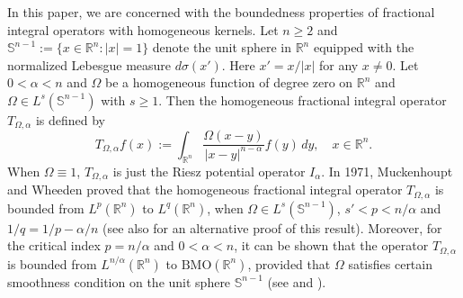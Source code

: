 \documentclass[preprint,10pt]{elsarticle}
\numberwithin{equation}{section}
\begin{document}
In this paper, we are concerned with the boundedness properties of fractional integral operators with homogeneous kernels.
Let $n\geq2$ and $\mathbb{S}^{n-1}:=\{x\in\mathbb R^n:|x|=1\}$ denote the unit sphere in $\mathbb R^n$ equipped with the normalized Lebesgue measure $d\sigma(x')$. Here $x'=x/{|x|}$ for any $x\neq0$. Let $0<\alpha<n$ and $\Omega$ be a homogeneous function of degree zero on $\mathbb R^n$ and $\Omega\in L^s(\mathbb{S}^{n-1})$ with $s\geq1$. Then the homogeneous fractional integral operator $T_{\Omega,\alpha}$ is defined by
\begin{equation*}
T_{\Omega,\alpha}f(x):=\int_{\mathbb R^n}\frac{\Omega(x-y)}{|x-y|^{n-\alpha}}f(y)\,dy,\quad x\in\mathbb R^n.
\end{equation*}
When $\Omega\equiv1$, $T_{\Omega,\alpha}$ is just the Riesz potential operator $I_{\alpha}$. In 1971, Muckenhoupt and Wheeden \cite{muckenhoupt1} proved that the homogeneous fractional integral operator $T_{\Omega,\alpha}$ is bounded from $L^p(\mathbb R^n)$ to $L^q(\mathbb R^n)$, when $\Omega\in L^s(\mathbb{S}^{n-1})$, $s'<p<n/{\alpha}$ and $1/q=1/p-\alpha/n$ (see also \cite[Theorem 2.1]{wang3} for an alternative proof of this result). Moreover, for the critical index $p=n/{\alpha}$ and $0<\alpha<n$, it can be shown that the operator $T_{\Omega,\alpha}$ is bounded from
$L^{n/{\alpha}}(\mathbb R^n)$ to $\mathrm{BMO}(\mathbb R^n)$, provided that $\Omega$ satisfies certain smoothness condition on the unit sphere $\mathbb{S}^{n-1}$ (see \cite[Theorem 1]{ding2} and \cite[Theorem 2.7]{wang3}).
\end{document}
